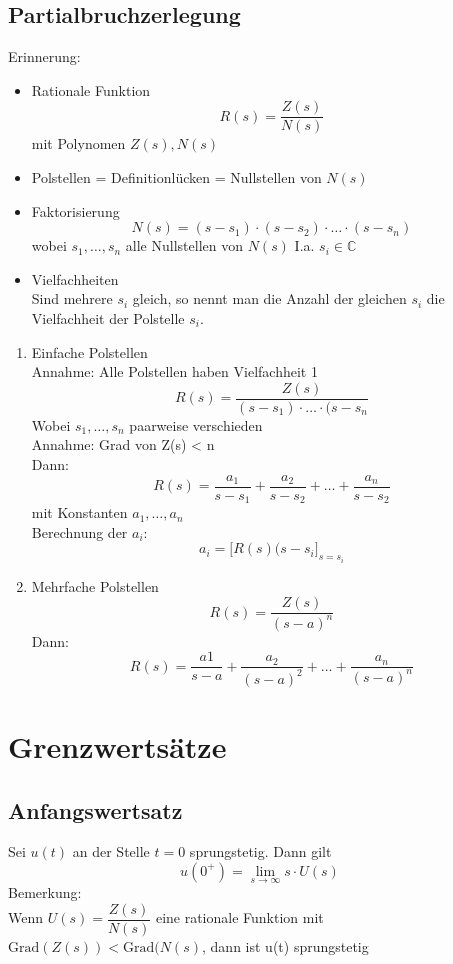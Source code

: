 \subsection{Partialbruchzerlegung}
Erinnerung: \\
\begin{itemize}
  \item Rationale Funktion
        \[ R(s) = \frac{Z(s)}{N(s)} \]
        mit Polynomen $Z(s), N(s)$
  \item Polstellen = Definitionlücken = Nullstellen von $N(s)$
  \item Faktorisierung
        \[ N(s) = (s - s_1) \cdot (s - s_2) \cdot \ldots \cdot (s - s_n) \]
        wobei $s_1, \ldots, s_n$ alle Nullstellen von $N(s)$ 
        I.a. $s_i \in \mathbb{C}$
  \item Vielfachheiten\\
        Sind mehrere $s_i$ gleich, so nennt man die Anzahl der gleichen $s_i$ 
        die Vielfachheit der Polstelle $s_i$. 
\end{itemize}
\begin{enumerate}
  \item Einfache Polstellen \\
        Annahme: Alle Polstellen haben Vielfachheit 1
        \[ R(s) = \frac{Z(s)}{(s - s_1) \cdot \ldots \cdot (s - s_n} \]
        Wobei $s_1, \ldots, s_n$ paarweise verschieden \\
        Annahme: Grad von Z(s) < n \\
        Dann: 
        \[ R(s) = \frac{a_1}{s - s_1} + \frac{a_2}{s - s_2} + \ldots 
        + \frac{a_n}{s - s_2} \]
        mit Konstanten $a_1, \ldots, a_n$\\
        Berechnung der $a_i$: 
        \[ a_i = \lbrack R(s) (s - s_i \rbrack_{s = s_i} \]
  \item Mehrfache Polstellen
        \[ R(s) = \frac{Z(s)}{(s - a)^n} \]
        Dann: 
        \[ R(s) = \frac{a1}{s - a} + \frac{a_2}{(s - a)^2} + \ldots 
        + \frac{a_n}{(s - a)^n} \]
\end{enumerate}

\section{Grenzwertsätze}

\subsection{Anfangswertsatz}
Sei $u(t)$ an der Stelle $t = 0$ sprungstetig. Dann gilt 
\[ u(0^+) = \lim\limits_{s \to \infty} s \cdot U(s) \]
Bemerkung: \\
Wenn $U(s) = \dfrac{Z(s)}{N(s)}$ eine rationale Funktion mit 
$\text{Grad}(Z(s)) < \text{Grad}(N(s)$, dann ist u(t) sprungstetig

